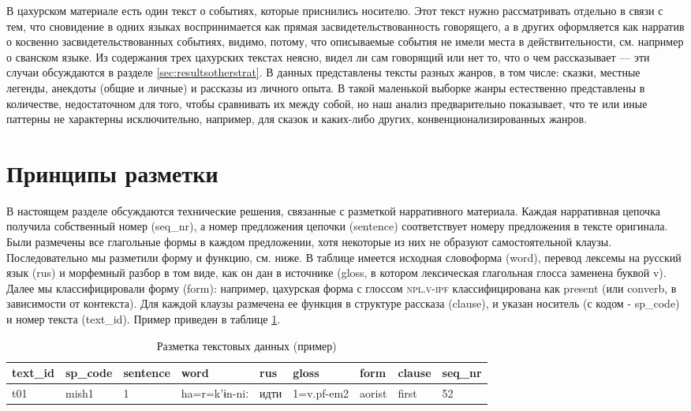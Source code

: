 В цахурском материале есть один текст о событиях, которые приснились носителю. Этот текст нужно рассматривать отдельно в связи с тем, что сновидение в одних языках воспринимается как прямая засвидетельствованность говорящего, а в других оформляется как нарратив о косвенно засвидетельствованных событиях, видимо, потому, что описываемые события не имели места в действительности, см. например \citep{sumbatova1999} о сванском языке. Из содержания трех цахурских текстах неясно, видел ли сам говорящий или нет то, что о чем рассказывает --- эти случаи обсуждаются в разделе \ref{sec:resultsotherstrat}. В данных представлены тексты разных жанров, в том числе: сказки, местные легенды, анекдоты (общие и личные) и рассказы из личного опыта. В такой маленькой выборке жанры естественно представлены в количестве, недостаточном для того, чтобы сравнивать их между собой, но наш анализ предварительно показывает, что те или иные паттерны не характерны исключительно, например, для сказок и каких-либо других, конвенционализированных жанров.

\vfill
\pagebreak

\section{Принципы разметки} \label{sec:annotation}

В настоящем разделе обсуждаются технические решения, связанные с разметкой нарративного материала. Каждая нарративная цепочка получила собственный номер (seq\_nr), а номер предложения цепочки (sentence) соответствует номеру предложения в тексте оригинала. Были размечены все глагольные формы в каждом предложении, хотя некоторые из них не образуют самостоятельной клаузы. Последовательно мы разметили форму и функцию, см. ниже. В таблице имеется исходная словоформа (word), перевод лексемы на русский язык (rus) и морфемный разбор в том виде, как он дан в источнике (gloss, в котором лексическая глагольная глосса заменена буквой v). Далее мы классифицировали форму (form): например, цахурская форма с глоссом \textsc{npl.v-ipf} классифицирована как present (или converb, в зависимости от контекста). Для каждой клаузы размечена ее функция в структуре рассказа (clause), и указан носитель (с кодом - sp\_code) и номер текста (text\_id). Пример приведен в таблице \ref{tab:annot}.

\begin{table}[H]
\small
\caption{Разметка текстовых данных (пример)}
\label{tab:annot}
\vspace{0.2cm}
\begin{center}
\begin{tabular}{l|l|l|l|l|l|l|l|l}
text\_id & sp\_code & sentence & word          & rus  & gloss      & form   & clause & seq\_nr \\ \hline
t01      & mish1    & 1        & ha=r=k'ɨn-niː & идти & 1=v.pf-em2 & aorist & first  & 52     
\end{tabular}
\end{center}
\end{table}

